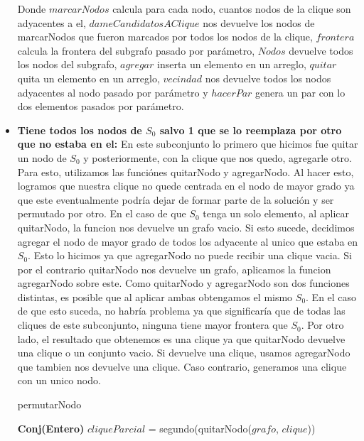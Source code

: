 \begin{itemize}
Donde $marcarNodos$ calcula para cada nodo, cuantos nodos de la clique son adyacentes a el, $dameCandidatosAClique$ nos devuelve los nodos de marcarNodos que fueron marcados por todos los nodos de la clique, $frontera$ calcula la frontera del subgrafo pasado por parámetro, $Nodos$ devuelve todos los nodos del subgrafo, $agregar$ inserta un elemento en un arreglo, $quitar$ quita un elemento en un arreglo, $vecindad$ nos devuelve todos los nodos adyacentes al nodo pasado por parámetro y $hacerPar$ genera un par con lo dos elementos pasados por parámetro. \newline

\item \textbf{Tiene todos los nodos de $S_{0}$ salvo 1 que se lo reemplaza por otro que no estaba en el:} \newline
En este subconjunto lo primero que hicimos fue quitar un nodo de $S_{0}$ y posteriormente, con la clique que nos quedo, agregarle otro. Para esto, utilizamos las funciónes quitarNodo y agregarNodo. Al hacer esto, logramos que nuestra clique no quede centrada en el nodo de mayor grado ya que este eventualmente podría dejar de formar parte de la solución y ser permutado por otro.\newline
En el caso de que $S_{0}$ tenga un solo elemento, al aplicar quitarNodo, la funcion nos devuelve un grafo vacio. Si esto sucede, decidimos agregar el nodo de mayor grado de todos los adyacente al unico que estaba en $S_{0}$. Esto lo hicimos ya que agregarNodo no puede recibir una clique vacia.\newline
Si por el contrario quitarNodo nos devuelve un grafo, aplicamos la funcion agregarNodo sobre este. \newline
Como quitarNodo y agregarNodo son dos funciones distintas, es posible que al aplicar ambas obtengamos el mismo $S_{0}$. En el caso de que esto suceda, no habría problema ya que significaría que de todas las cliques de este subconjunto, ninguna tiene mayor frontera que $S_{0}$. Por otro lado, el resultado que obtenemos es una clique ya que quitarNodo devuelve una clique o un conjunto vacio. Si devuelve una clique, usamos agregarNodo que tambien nos devuelve una clique. Caso contrario, generamos una clique con un unico nodo.
\begin{algorithm}[H]
    \SetAlgoLined
    \caption{permutarNodo}
	
   \textbf{Conj(Entero)} $cliqueParcial$ = segundo(quitarNodo($grafo$, $clique$)) \\


\end{algorithm}
\end{itemize}
